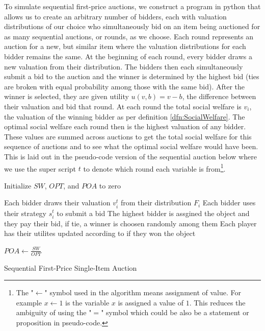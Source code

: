\documentclass[12pt,twoside]{reedthesis}
\begin{document}
To simulate sequential first-price auctions, we construct a program in python that allows us to create an arbitrary number of bidders, each with valuation distributions of our choice who simultaneously bid on an item being auctioned for as many sequential auctions, or rounds, as we choose. Each round represents an auction for a new, but similar item where the valuation distributions for each bidder remains the same. At the beginning of each round, every bidder draws a new valuation from their distribution. The bidders then each simultaneously submit a bid to the auction and the winner is determined by the highest bid (ties are broken with equal probability among those with the same bid). After the winner is selected, they are given utility $u(v, b) = v - b$, the difference between their valuation and bid that round. At each round the total social welfare is $v_i$, the valuation of the winning bidder as per definition \ref{dfn:SocialWelfare}. The optimal social welfare each round then is the highest valuation of any bidder. These values are summed across auctions to get the total social welfare for this sequence of auctions and to see what the optimal social welfare would have been. This is laid out in the pseudo-code version of the sequential auction below where we use the super script $t$ to denote which round each variable is from\footnote{The "$\leftarrow$" symbol used in the algorithm means assignment of value. For example $x \leftarrow 1$ is the variable $x$ is assigned a value of $1$. This reduces the ambiguity of using the "$=$" symbol which could be also be a statement or proposition in pseudo-code.}.\\

\begin{algorithm}[H]
	Initialize $SW$, $OPT$, and $POA$ to zero\\
	{
		Each bidder draws their valuation $v^t_i$ from their distribution $F_i$\;
		Each bidder uses their strategy $s^t_i$ to submit a bid\;
		The highest bidder is assgined the object and they pay their bid, if tie, a winner is choosen randomly among them\;
		Each player has their utilites updated according to if they won the object\;
	
		$POA \leftarrow \frac{SW}{OPT}$	
	}
\caption{Sequential First-Price Single-Item Auction}
\label{alg:main}
\end{algorithm}
\end{document}
